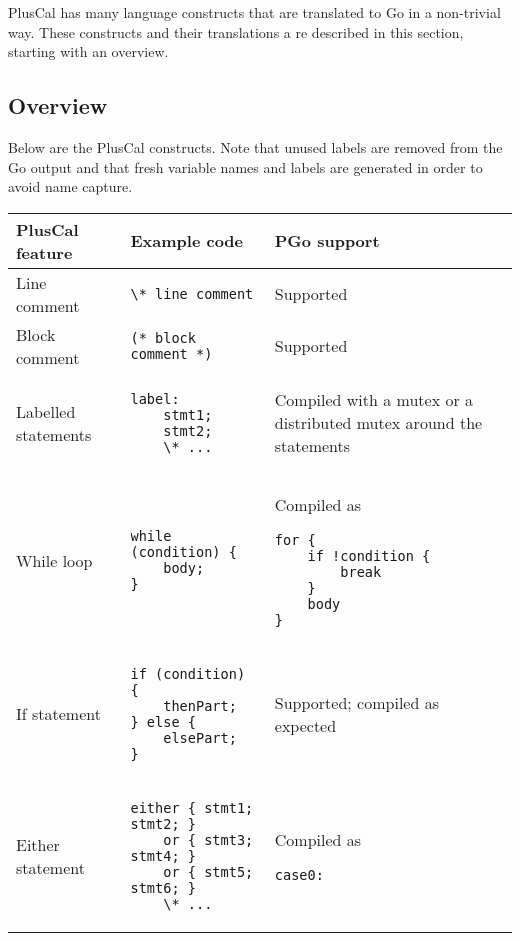 PlusCal has many language constructs that are translated to Go in a non-trivial way. These constructs and their translations a
re described in this section, starting with an overview.

\subsection{Overview}
Below are the PlusCal constructs. Note that unused labels are removed from the Go output and that fresh variable names and labels are generated in order to avoid name capture.

\begin{center}
\lstset{style=tabularstyle}
\renewcommand{\arraystretch}{1.5}
\begin{longtable}{ || m{} | m{} | m{} || }
	\hline
	\textbf{PlusCal feature} & \textbf{Example code} & \textbf{PGo support} \\
	\hline\hline
	Line comment & \lstinline[language=pcal]|\* line comment| & Supported \\
	\hline
	Block comment & \lstinline[language=pcal]|(* block comment *)| & Supported \\
	\hline
	Labelled statements &
	\begin{lstlisting}[language=pcal]
label:
	stmt1;
	stmt2;
	\* ...
	\end{lstlisting} &
	Compiled with a mutex or a distributed mutex around the statements \\
	\hline
	While loop &
	\begin{lstlisting}[language=pcal]
while (condition) {
	body;
}
	\end{lstlisting} &
	Compiled as
	\begin{lstlisting}[language=golang]
for {
	if !condition {
		break
	}
	body
}
	\end{lstlisting} \\
	\hline
	If statement &
	\begin{lstlisting}[language=pcal]
if (condition) {
	thenPart;
} else {
	elsePart;
}
	\end{lstlisting} &
	Supported; compiled as expected \\
	\hline
	Either statement &
	\begin{lstlisting}[language=pcal]
either { stmt1; stmt2; }
    or { stmt3; stmt4; }
    or { stmt5; stmt6; }
    \* ...
	\end{lstlisting} &
	Compiled as
	\begin{lstlisting}[language=golang]
case0:

\end{lstlisting}
\end{longtable}
\end{center}
